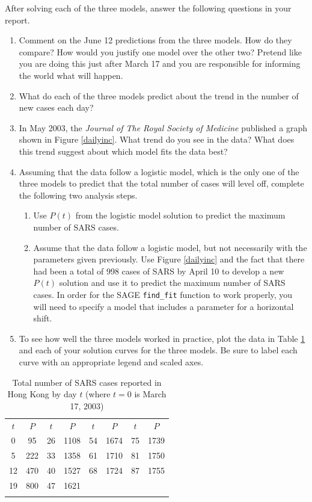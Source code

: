 \documentclass
[justified,nohyper]
{tufte-handout}
\begin{document}
After solving each of the three models, answer the following questions in your report.

\begin{enumerate}
  \item Comment on the June 12 predictions from the three models. How do they compare? How would you justify one model over the other two? Pretend like you are doing this just after March 17 and you are responsible for informing the world what will happen.
  \item What do each of the three models predict about the trend in the number of new cases each day?
  \item In May 2003, the \textit{Journal of The Royal Society of Medicine} published a graph shown in Figure \ref{dailyinc}. What trend do you see in the data? What does this trend suggest about which model fits the data best?


  \item Assuming that the data follow a logistic model, which is the only one of the three models to predict that the total number of cases will level off, complete the following two analysis steps.
  \begin{enumerate}
  \item Use $P(t)$ from the logistic model solution to predict the maximum number of SARS cases.
  \item Assume that the data follow a logistic model, but not necessarily with the parameters given 
  previously. Use Figure \ref{dailyinc} and the fact that there had been a total of 998 cases of SARS by 
  April 10 to develop a new $P(t)$ solution and use it to predict the maximum number of SARS cases.
  In order for the SAGE \verb|find_fit| function to work properly, you will need to specify a model
  that includes a parameter for a horizontal shift.
\end{enumerate}

  \item To see how well the three models worked in practice, plot the data in Table \ref{sarscases} and each of your solution curves for the three models. Be sure to label each curve with an appropriate legend and scaled axes.
\end{enumerate}


\begin{fullwidth}
\begin{table}
\begin{tabular}{cccccccc}
    \toprule
    $t$ & $P$ & $t$ & $P$ & $t$ & $P$ & $t$ & $P$ \\
    \cmidrule(r){1-2}\cmidrule(r){3-4}\cmidrule(r){5-6}\cmidrule{7-8}
    0 & 95 & 26 & 1108 & 54 & 1674 & 75 & 1739 \\
    5 & 222 & 33 & 1358 & 61 & 1710 & 81 & 1750 \\
    12 & 470 & 40 & 1527 & 68 & 1724 & 87 & 1755 \\
    19 & 800 & 47 & 1621 & & &  \\
    \bottomrule
\caption{\label{sarscases} Total number of SARS cases reported in Hong Kong by day $t$ (where $t=0$ is March 17, 2003)}
\end{tabular}
\end{table}
\end{fullwidth}
\end{document}
